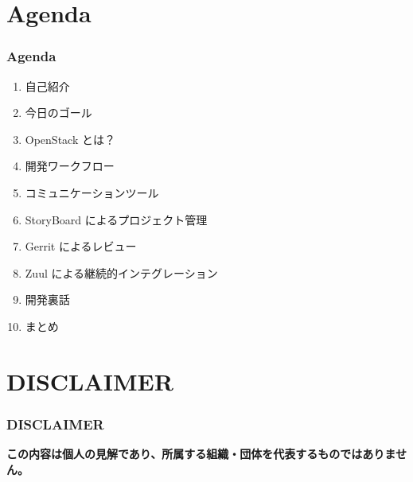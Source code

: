 \documentclass[aspectratio=169,11pt,hyperref={colorlinks=true}]{beamer}
\begin{document}
\section{Agenda}
\begin{frame}
  \frametitle{Agenda}
  \begin{enumerate}
    \item 自己紹介
    \item 今日のゴール
    \item OpenStack とは？
    \item 開発ワークフロー
    \item コミュニケーションツール
    \item StoryBoard によるプロジェクト管理
    \item Gerrit によるレビュー
    \item Zuul による継続的インテグレーション
    \item 開発裏話
    \item まとめ
  \end{enumerate}
\end{frame}

\section{DISCLAIMER}
\begin{frame}
  \frametitle{DISCLAIMER}
  \Huge{\bf{この内容は個人の見解であり、所属する組織・団体を代表するものではありません。}}
\end{frame}
\end{document}
